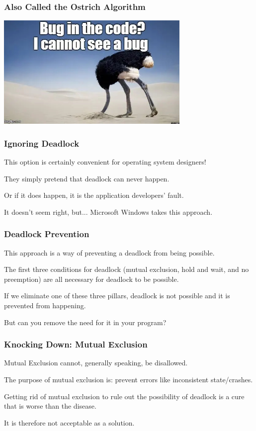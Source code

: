 \begin{frame}
	\frametitle{Also Called the Ostrich Algorithm}

	\begin{center}
		\includegraphics[width=0.7\textwidth]{images/ostrich-head-sand.jpg}
	\end{center}


\end{frame}


\begin{frame}
	\frametitle{Ignoring Deadlock}

	This option is certainly convenient for operating system designers!

	They simply pretend that deadlock can never happen.

	Or if it does happen, it is the application developers' fault.

	It doesn't seem right, but... Microsoft Windows takes this approach.

\end{frame}

\begin{frame}
	\frametitle{Deadlock Prevention}

	This approach is a way of preventing a deadlock from being possible.

	The first three conditions for deadlock (mutual exclusion, hold and wait, and no preemption) are all necessary for deadlock to be possible.

	If we eliminate one of these three pillars, deadlock is not possible and it is prevented from happening.

	But can you remove the need for it in your program?

\end{frame}

\begin{frame}
	\frametitle{Knocking Down: Mutual Exclusion}

	Mutual Exclusion cannot, generally speaking, be disallowed.

	The purpose of  mutual exclusion is: prevent errors like inconsistent state/crashes.

	Getting rid of mutual exclusion to rule out the possibility of deadlock is a cure that is worse than the disease.

	It is therefore not acceptable as a solution.


\end{frame}

